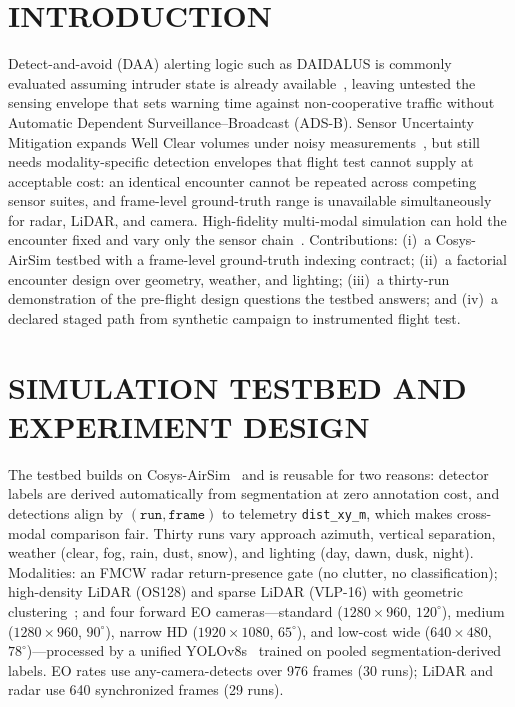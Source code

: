 \documentclass{wscposterproc}
\begin{document}
\section{INTRODUCTION}
\label{sec:intro}
Detect-and-avoid (DAA) alerting logic such as DAIDALUS is commonly evaluated assuming intruder state is already available~, leaving untested the sensing envelope that sets warning time against non-cooperative traffic without Automatic Dependent Surveillance--Broadcast (ADS-B).
Sensor Uncertainty Mitigation expands Well Clear volumes under noisy measurements~\cite{abramson2020sum}, but still needs modality-specific detection envelopes that flight test cannot supply at acceptable cost: an identical encounter cannot be repeated across competing sensor suites, and frame-level ground-truth range is unavailable simultaneously for radar, LiDAR, and camera.
High-fidelity multi-modal simulation can hold the encounter fixed and vary only the sensor chain~.
Contributions: (i)~a Cosys-AirSim testbed with a frame-level ground-truth indexing contract; (ii)~a factorial encounter design over geometry, weather, and lighting; (iii)~a thirty-run demonstration of the pre-flight design questions the testbed answers; and (iv)~a declared staged path from synthetic campaign to instrumented flight test.

\section{SIMULATION TESTBED AND EXPERIMENT DESIGN}
\label{sec:method}
The testbed builds on Cosys-AirSim~ and is reusable for two reasons: detector labels are derived automatically from segmentation at zero annotation cost, and detections align by $(\texttt{run},\texttt{frame})$ to telemetry \texttt{dist\_xy\_m}, which makes cross-modal comparison fair.
Thirty runs vary approach azimuth, vertical separation, weather (clear, fog, rain, dust, snow), and lighting (day, dawn, dusk, night).
Modalities: an FMCW radar return-presence gate (no clutter, no classification); high-density LiDAR (OS128) and sparse LiDAR (VLP-16) with geometric clustering~; and four forward EO cameras---standard ($1280{\times}960$, $120^\circ$), medium ($1280{\times}960$, $90^\circ$), narrow HD ($1920{\times}1080$, $65^\circ$), and low-cost wide ($640{\times}480$, $78^\circ$)---processed by a unified YOLOv8s~ trained on pooled segmentation-derived labels.
EO rates use any-camera-detects over 976 frames (30 runs); LiDAR and radar use 640 synchronized frames (29 runs).
\end{document}
